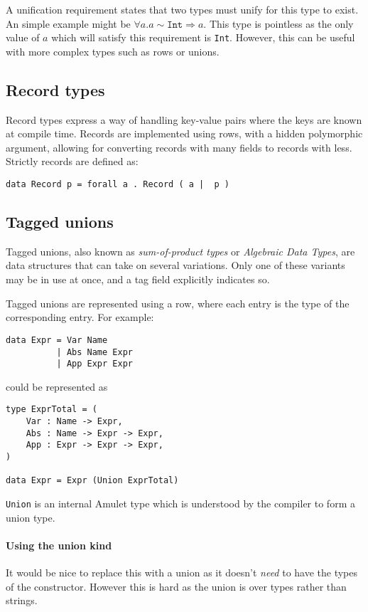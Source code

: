 A unification requirement states that two types must unify for this type to exist. An simple example might be $\forall a. a \sim \mathtt{Int} \Rightarrow a$. This type is pointless as the only value of $a$ which will satisfy this requirement is \texttt{Int}. However, this can be useful with more complex types such as rows or unions.

\subsection{Record types}
Record types express a way of handling key-value pairs where the keys are known at compile time. Records are implemented using rows, with a hidden polymorphic argument, allowing for converting records with many fields to records with less. Strictly records are defined as:

\begin{verbatim}
data Record p = forall a . Record ( a |  p )
\end{verbatim}

\subsection{Tagged unions}
Tagged unions, also known as \textit{sum-of-product types} or \textit{Algebraic Data Types}, are data structures that can take on several variations. Only one of these variants may be in use at once, and a tag field explicitly indicates so.

Tagged unions are represented using a row, where each entry is the type of the corresponding entry. For example:

\begin{verbatim}
data Expr = Var Name
          | Abs Name Expr
          | App Expr Expr
\end{verbatim}
could be represented as
\begin{verbatim}
type ExprTotal = (
    Var : Name -> Expr, 
    Abs : Name -> Expr -> Expr, 
    App : Expr -> Expr -> Expr,
)

data Expr = Expr (Union ExprTotal)
\end{verbatim}

\texttt{Union} is an internal Amulet type which is understood by the compiler to form a union type.

\paragraph{Using the union kind}
It would be nice to replace this with a union as it doesn't \textit{need} to have the types of the constructor. However this is hard as the union is over types rather than strings.

